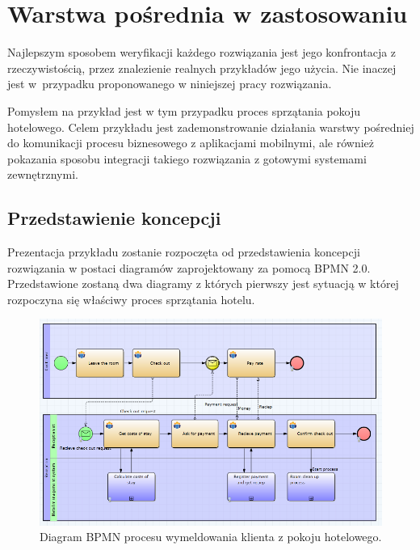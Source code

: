 \chapter{Warstwa pośrednia w zastosowaniu }
\label{cha:example}

Najlepszym sposobem weryfikacji każdego rozwiązania jest jego konfrontacja z rzeczywistością, przez znalezienie realnych przykładów jego użycia. Nie inaczej jest w~przypadku proponowanego w niniejszej pracy rozwiązania. 

Pomysłem na przykład jest w tym przypadku proces sprzątania pokoju hotelowego. Celem przykładu jest zademonstrowanie działania warstwy pośredniej do komunikacji procesu biznesowego z aplikacjami mobilnymi, ale również pokazania sposobu integracji takiego rozwiązania z gotowymi systemami zewnętrznymi. 


\section{Przedstawienie koncepcji}
\label{sec:concept}

Prezentacja przykładu zostanie rozpoczęta od przedstawienia koncepcji rozwiązania w postaci diagramów zaprojektowany za pomocą BPMN 2.0. Przedstawione zostaną dwa diagramy z których pierwszy jest sytuacją w której rozpoczyna się właściwy proces sprzątania hotelu. 

\begin{figure}[h]
\centerline{\includegraphics[scale=0.5]{hotelCheckOutProcess}}
\caption{Diagram BPMN procesu wymeldowania klienta z pokoju hotelowego.}
\label{fig:hotelCheckOutProcess}
\end{figure}

